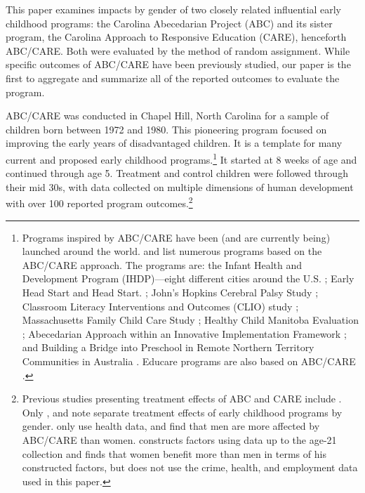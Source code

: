 This paper examines impacts by gender of two closely related influential early childhood programs: the Carolina Abecedarian Project (ABC) and its sister program, the Carolina Approach to Responsive Education (CARE), henceforth ABC/CARE. Both were evaluated by the method of random assignment. While specific outcomes of ABC/CARE have been previously studied, our paper is the first to aggregate and summarize all of the reported outcomes to evaluate the program.

ABC/CARE was conducted in Chapel Hill, North Carolina for a sample of children born between 1972 and 1980. This pioneering program focused on improving the early years of disadvantaged children. It is a template for many current and proposed early childhood programs.\footnote{Programs inspired by ABC/CARE have been (and are currently being) launched around the world. \citet{Sparling_2010_Highlights} and \citet{Ramey_Ramey_Lanzi_2014_Interventions} list numerous programs based on the ABC/CARE approach. The programs are: the Infant Health and Development Program (IHDP)---eight different cities around the U.S. \citep{Spiker-etal_1997_Helping}; Early Head Start and Head Start. \citep{Schneider_McDonald-eds_2007_Scale-Up_Vol-1}; John's Hopkins Cerebral Palsy Study \citep{Sparling_2010_Highlights}; Classroom Literacy Interventions and Outcomes (CLIO) study \citep{Sparling_2010_Highlights}; Massachusetts Family Child Care Study \citep{Collins_etal_2010_Massachusetts-Study}; Healthy Child Manitoba Evaluation \citep{Healthy_Child_Manitoba_2015_Starting-Early}; Abecedarian Approach within an Innovative Implementation Framework \citep{Jensen_Nielsen_2016_ABC-Programme-Pilot}; and Building a Bridge into Preschool in Remote Northern Territory Communities in Australia \citep{UMonash_Dataset_2015_URL}. Educare programs are also based on ABC/CARE \citep{Educare_2014_Research_Agenda,Yazejian_Bryant_2012_Educare}.} It started at 8 weeks of age and continued through age 5. Treatment and control children were followed through their mid 30s, with data collected on multiple dimensions of human development with over 100 reported program outcomes.\footnote{Previous studies presenting treatment effects of ABC and CARE include \citet{Ramey_etal_1985_Project-CARE_TiECSE,Clarke_Campbell_1998_ABC_Comparison_ECRQ,Campbell_Pungello_etal_2001_DP,Campbell_Ramey_etal_2002_ADS,Anderson_2008_JASA,Campbell_Wasik_etal_2008_ECRQ,Campbell_Conti_etal_2014_EarlyChildhoodInvestments}. Only \citet{Heckman_2006_Science}, \citet{Anderson_2008_JASA} and \citet{Campbell_Conti_etal_2014_EarlyChildhoodInvestments} note separate treatment effects of early childhood programs by gender. \citet{Campbell_Conti_etal_2014_EarlyChildhoodInvestments} only use health data, and find that men are more affected by ABC/CARE than women. \citet{Anderson_2008_JASA} constructs factors using data up to the age-21 collection and finds that women benefit more than men in terms of his constructed factors, but does not use the crime, health, and employment data used in this paper.}

